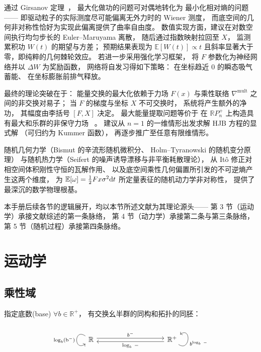 ﻿\documentclass[10pt,a4paper]{article}
\numberwithin{equation}{section}
\begin{document}
通过 Girsanov 定理~\cite{Bismut1981LargeDeviations}，
最大化做功的问题可对偶地转化为
最小化相对熵的问题——
即驱动粒子的实际测度尽可能偏离无外力时的 Wiener 测度，
而底空间的几何非对称性恰好为实现此偏离提供了曲率自由度。
数值实现方面，建议在对数空间执行均匀步长的 Euler--Maruyama 离散，
随后通过指数映射拉回至 $X$，
监测累积功 $W(t)$ 的期望与方差；
预期结果表现为 $\mathbb E[W(t)] \propto t$ 
且斜率显著大于零，即纯粹的几何棘轮效应。
若进一步采用强化学习框架，
将 $F$ 参数化为神经网络并以 $\Delta W$ 为奖励函数，
网络将自发习得如下策略：
在坐标趋近 $0$ 的瞬态吸气蓄能、
在坐标膨胀前排气释放。

最终的理论突破在于：
能量交换的最大化依赖于力场 $F(x)$
与乘性联络 $\nabla^{\mathrm{mult}}$ 之间的非交换对易子；
当 $F$ 的梯度与坐标 $X$ 不可交换时，
系统将产生额外的净功，
其幅度由李括号 $[F, X]$ 决定。
最大能量提取问题等价于
在 $\mathbb R P^+_n$ 上构造具有最大和乐群的非保守力场
~\cite{KobayashiNomizu1963Foundations}。
建议从 $n=1$ 的一维情形出发求解 HJB 方程的显式解
（可归约为 Kummer 函数），
再逐步推广至任意有限维情形。

随机几何力学（Bismut 的辛流形随机微积分、
Holm--Tyranowski 的随机变分原理）
与随机热力学（Seifert 的噪声诱导漂移与非平衡耗散理论），
从 It\^{o} 修正对相空间体积刚性守恒的瓦解作用、
以及底空间乘性几何偏置所引发的不可逆熵产生这两个维度，
为 $\mathbb E[\omega] = \frac{1}{2}Fx\sigma^2 \text dt$
所定量表征的随机动力学非对称性，
提供了最深沉的数学物理根基。

本手册后续各节的逻辑展开，均以本节所述文献为其理论源头——
第 3 节（运动学）承接文献综述的第一条脉络，
第 4 节（动力学）承接第二条与第三条脉络，
第 5 节（随机过程）承接第四条脉络。

\section{运动学}

\subsection{乘性域}


指定底数(base) $\forall b\in\mathbb R^+$，
有交换幺半群的同构和拓扑的同胚：

$$
\begin{tikzcd}
\mathbb R \arrow[rrrr, "b^-", shift left] \arrow["\text{log}_b(\text b^-)"', loop, distance=2em, in=215, out=145] &  &  &  & \mathbb R^+ \arrow[llll, "\text{log}_b \ -", shift left] \arrow["b^{\text{log}_b \ -}"', loop, distance=2em, in=35, out=325]
\end{tikzcd}
$$
\end{document}
